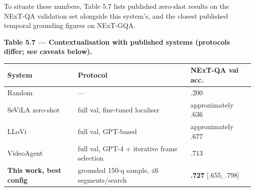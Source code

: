 To situate these numbers, Table 5.7 lists published zero-shot results on
the NExT-QA validation set alongside this system's, and the closest
published temporal grounding figures on NExT-GQA.

\textbf{Table 5.7 --- Contextualisation with published systems
(protocols differ; see caveats below).}

\begin{longtable}[]{@{}
  >{\raggedright\arraybackslash}p{}
  >{\raggedright\arraybackslash}p{}
  >{\raggedright\arraybackslash}p{}@{}}
\toprule\noalign{}
\begin{minipage}[b]{\linewidth}\raggedright
System
\end{minipage} & \begin{minipage}[b]{\linewidth}\raggedright
Protocol
\end{minipage} & \begin{minipage}[b]{\linewidth}\raggedright
NExT-QA val acc.
\end{minipage} \\
\midrule\noalign{}
\endhead
\bottomrule\noalign{}
\endlastfoot
Random & --- & .200 \\
SeViLA zero-shot \autocite{yu2023sevila} & full val, fine-tuned
localiser & approximately .636 \\
LLoVi \autocite{zhang2024llovi} & full val, GPT-based & approximately
.677 \\
VideoAgent \autocite{wang2024videoagent} & full val, GPT-4 + iterative
frame selection & .713 \\
\textbf{This work, best config} & grounded 150-q sample, ≤6
segments/search & \textbf{.727} {[}.655, .798{]} \\
\end{longtable}

